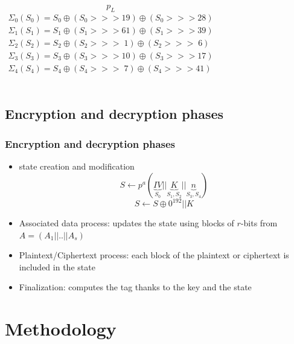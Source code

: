 \documentclass{beamer}
\begin{document}
\begin{frame}
\begin{columns}
			$$p_L$$
			\tiny
			\begin{gather*}
				\Sigma_0(S_0) = S_0 \oplus (S_0 >>> 19) \oplus (S_0 >>> 28)\\
				\Sigma_1(S_1) = S_1 \oplus (S_1 >>> 61) \oplus (S_1 >>> 39)\\
				\Sigma_2(S_2) = S_2 \oplus (S_2 >>> \;  1) \oplus (S_2 >>> \; 6)\\
				\Sigma_3(S_3) = S_3 \oplus (S_3 >>> 10) \oplus (S_3 >>> 17)\\
				\Sigma_4(S_4) = S_4 \oplus (S_4 >>> \; 7) \oplus (S_4 >>> 41)\\
			\end{gather*}
		\end{columns}
	\end{frame}
	
	\subsection{Encryption and decryption phases}
	\begin{frame}
		\frametitle{Encryption and decryption phases}	
		\begin{itemize}
			\item state creation and modification
			$$S \leftarrow p^{a}( \underbrace{IV}_{S_0}||\underbrace{K}_{S_1,S_2}||\underbrace{n}_{S_3,S_4})$$
			$$S \leftarrow S \oplus 0^{192} || K$$
			\item Associated data process: updates the state using blocks of $r$-bits from $A=(A_1||..||A_s)$
			\item Plaintext/Ciphertext process: each block of the plaintext or ciphertext is included in the state
			\item Finalization: computes the tag thanks to the key and the state
		\end{itemize}	
	\end{frame}

	
	\section{Methodology}
\end{document}
